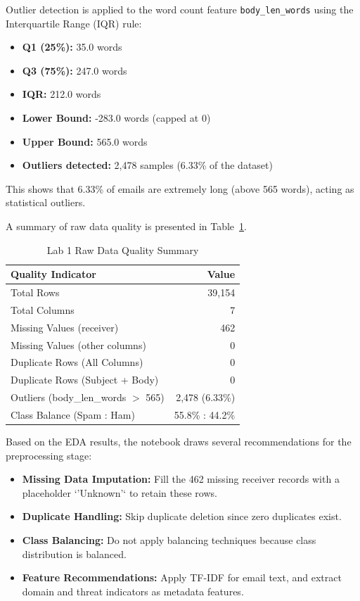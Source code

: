 \documentclass[12pt,a4paper]{article}
\begin{document}
Outlier detection is applied to the word count feature \texttt{body\_len\_words} using the Interquartile Range (IQR) rule:
\begin{itemize}
    \item \textbf{Q1 (25\%):} 35.0 words
    \item \textbf{Q3 (75\%):} 247.0 words
    \item \textbf{IQR:} 212.0 words
    \item \textbf{Lower Bound:} -283.0 words (capped at 0)
    \item \textbf{Upper Bound:} 565.0 words
    \item \textbf{Outliers detected:} 2,478 samples (6.33\% of the dataset)
\end{itemize}
This shows that 6.33\% of emails are extremely long (above 565 words), acting as statistical outliers.

A summary of raw data quality is presented in Table~\ref{tab:lab1_quality}.
\begin{table}[H]
\centering
\caption{Lab 1 Raw Data Quality Summary}
\label{tab:lab1_quality}
\begin{tabular}{lr}
\toprule
\textbf{Quality Indicator} & \textbf{Value} \\
\midrule
Total Rows & 39,154 \\
Total Columns & 7 \\
Missing Values (receiver) & 462 \\
Missing Values (other columns) & 0 \\
Duplicate Rows (All Columns) & 0 \\
Duplicate Rows (Subject + Body) & 0 \\
Outliers (body\_len\_words $>$ 565) & 2,478 (6.33\%) \\
Class Balance (Spam : Ham) & 55.8\% : 44.2\% \\
\bottomrule
\end{tabular}
\end{table}

Based on the EDA results, the notebook draws several recommendations for the preprocessing stage:
\begin{itemize}
    \item \textbf{Missing Data Imputation:} Fill the 462 missing receiver records with a placeholder `'Unknown'` to retain these rows.
    \item \textbf{Duplicate Handling:} Skip duplicate deletion since zero duplicates exist.
    \item \textbf{Class Balancing:} Do not apply balancing techniques because class distribution is balanced.
    \item \textbf{Feature Recommendations:} Apply TF-IDF for email text, and extract domain and threat indicators as metadata features.
\end{itemize}
\end{document}
